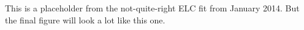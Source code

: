 This is a placeholder from the not-quite-right ELC fit from January 2014. But the final figure will look a lot like this one.